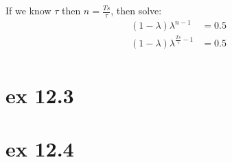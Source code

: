 If we know $\tau$ then $n=\frac{Ts}{\tau}$, then solve:
\begin{equation}
\begin{split}
(1-\lambda)\lambda^{n-1} & = 0.5 \\
(1-\lambda)\lambda^{\frac{Ts}{\tau}-1} & = 0.5 \\
\end{split}
\end{equation}

\section{ex 12.3}
\section{ex 12.4}
